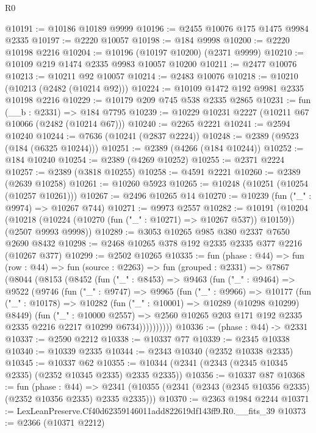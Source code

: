 \begin{lexlean}{R0}
\begin{coremodule}
@10191 := @10186 @10189 @9999
@10196 := @2455 @10076 @175 @1475 @9984 @2335
@10197 := @2220 @10057
@10198 := @184 @9998
@10200 := @2220 @10198 @2216
@10204 := @10196 (@10197 @10200) (@2371 @9999)
@10210 := @10109 @219 @1474 @2335 @9983 @10057 @10200
@10211 := @2477 @10076
@10213 := @10211 @92 @10057
@10214 := @2483 @10076
@10218 := @10210 (@10213 (@2482 (@10214 @92)))
@10224 := @10109 @1472 @192 @9981 @2335 @10198 @2216
@10229 := @10179 @209 @745 @538 @2335 @2865
@10231 := fun (__b : @2331) => @184 @7795
@10239 := @10229 @10231 @2227 (@10211 @67 @10066 (@2482 (@10214 @67)))
@10240 := @2265 @2221
@10241 := @2594 @10240
@10244 := @7636 (@10241 (@2837 @2224))
@10248 := @2389 (@9523 (@184 (@6325 @10244)))
@10251 := @2389 (@4266 (@184 @10244))
@10252 := @184 @10240
@10254 := @2389 (@4269 @10252)
@10255 := @2371 @2224
@10257 := @2389 (@3818 @10255)
@10258 := @4591 @2221
@10260 := @2389 (@2639 @10258)
@10261 := @10260 @5923
@10265 := @10248 (@10251 (@10254 (@10257 @10261)))
@10267 := @2496 @10265 @14
@10270 := @10239 (fun ("_" : @9974) => @10267 @744)
@10271 := @9973 @2557
@10282 := @10191
    (@10204
      (@10218 (@10224 (@10270 (fun ("_" : @10271) => @10267 @537)) @10159))
      (@2507 @9993 @9998))
@10289 := @3053 @10265 @985 @380 @2337 @7650 @2690 @8432
@10298 := @2468 @10265 @378 @192 @2335 @2335 @377 @2216 (@10267 @377)
@10299 := @2502 @10265
@10335 := fun (phase : @44) =>
  fun (row : @44) =>
  fun (source : @2263) =>
  fun (grouped : @2331) =>
  @7867
    (@8044
      (@8153
        (@8452
          (fun ("_" : @8453) =>
          @9463
            (fun ("_" : @9464) =>
            @9522
              (@9746
                (fun ("_" : @9747) =>
                @9965
                  (fun ("_" : @9966) =>
                  @10177
                    (fun ("_" : @10178) =>
                    @10282
                      (fun ("_" : @10001) => @10289 (@10298 @10299) @8449)
                      (fun ("_" : @10000 @2557) =>
                      @2560 @10265 @203 @171 @192 @2335 @2335 @2216 @2217 @10299 @6734))))))))))
@10336 := (phase : @44) -> @2331
@10337 := @2590 @2212
@10338 := @10337 @77
@10339 := @2345 @10338
@10340 := @10339 @2335
@10344 := @2343 @10340 (@2352 @10338 @2335)
@10345 := @10337 @62
@10355 := @10344 (@2341 (@2343 (@2345 @10345 @2335) (@2352 @10345 @2335) @2335 @2335))
@10356 := @10337 @87
@10368 := fun (phase : @44) =>
  @2341 (@10355 (@2341 (@2343 (@2345 @10356 @2335) (@2352 @10356 @2335) @2335 @2335)))
@10370 := @2363 @1984 @2244
@10371 := LexLeanPreserve.Cf40d62359146011add822619df143ff9.R0.__fits_39
@10373 := @2366 (@10371 @2212)

\end{coremodule}
\end{lexlean}
